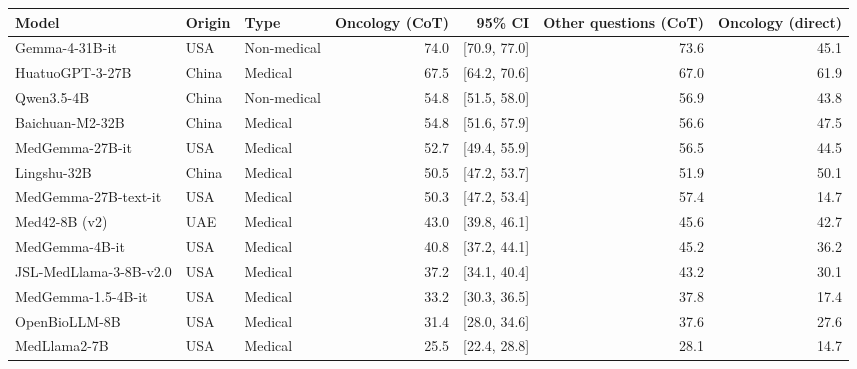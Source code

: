 \begin{tabular}{@{}lllrrrr@{}}
\toprule
Model & Origin & Type & Oncology (CoT) & 95\% CI & Other questions (CoT) & Oncology (direct) \\
\midrule
Gemma-4-31B-it & USA & Non-medical & 74.0 & [70.9, 77.0] & 73.6 & 45.1 \\
HuatuoGPT-3-27B & China & Medical & 67.5 & [64.2, 70.6] & 67.0 & 61.9 \\
Qwen3.5-4B & China & Non-medical & 54.8 & [51.5, 58.0] & 56.9 & 43.8 \\
Baichuan-M2-32B & China & Medical & 54.8 & [51.6, 57.9] & 56.6 & 47.5 \\
MedGemma-27B-it & USA & Medical & 52.7 & [49.4, 55.9] & 56.5 & 44.5 \\
Lingshu-32B & China & Medical & 50.5 & [47.2, 53.7] & 51.9 & 50.1 \\
MedGemma-27B-text-it & USA & Medical & 50.3 & [47.2, 53.4] & 57.4 & 14.7 \\
Med42-8B (v2) & UAE & Medical & 43.0 & [39.8, 46.1] & 45.6 & 42.7 \\
MedGemma-4B-it & USA & Medical & 40.8 & [37.2, 44.1] & 45.2 & 36.2 \\
JSL-MedLlama-3-8B-v2.0 & USA & Medical & 37.2 & [34.1, 40.4] & 43.2 & 30.1 \\
MedGemma-1.5-4B-it & USA & Medical & 33.2 & [30.3, 36.5] & 37.8 & 17.4 \\
OpenBioLLM-8B & USA & Medical & 31.4 & [28.0, 34.6] & 37.6 & 27.6 \\
MedLlama2-7B & USA & Medical & 25.5 & [22.4, 28.8] & 28.1 & 14.7 \\
\bottomrule
\end{tabular}
